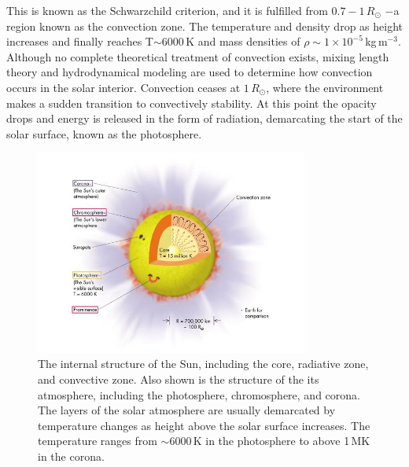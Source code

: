 This is known as the Schwarzchild criterion, and it is fulfilled from $0.7-1\,R_{\odot}$ $-$a region known as the convection zone. The temperature and density drop as height increases and finally reaches T$\sim$$6000$\,K and mass densities of $\rho\sim1\times10^{-5}$\,kg\,m$^{-3}$. Although no complete theoretical treatment of convection exists, mixing length theory and hydrodynamical modeling are used to determine how convection occurs in the solar interior. Convection ceases at $1\,R_{\odot}$, where the environment makes a sudden transition to convectively stability. At this point the opacity drops and energy is released in the form of radiation, demarcating the start of the solar surface, known as the photosphere. 
\begin{figure}[!t]
\begin{center}
\includegraphics[trim = 0cm 0.5cm 0cm 0cm, width=0.8\textwidth]{images/solar_atmosphere}
\caption[The solar interior and atmosphere]{The internal structure of the Sun, including the core, radiative zone, and convective zone.  Also shown is the structure of the its atmosphere, including the photosphere, chromosphere, and corona. The layers of the solar atmosphere are usually demarcated by temperature changes as height above the solar surface increases. The temperature ranges from $\sim$6000\,K in the photosphere to above 1\,MK in the corona.}
\label{fig:solar_atmosphere} 
\end{center}
\end{figure}


